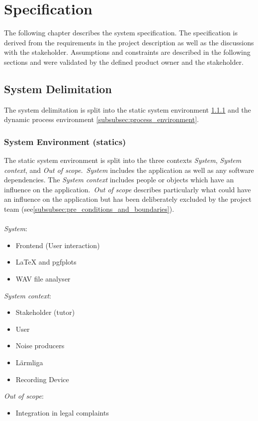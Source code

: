\section{Specification}\label{sec:specification}
The following chapter describes the system specification.
The specification is derived from the requirements in the project description
as well as the discussions with the stakeholder.
Assumptions and constraints are described in the following sections and were validated by
the defined product owner and the stakeholder.

\subsection{System Delimitation}\label{subsec:system-delimination}
The system delimitation is split into the static system environment \ref{subsubsec:system_environment}
and the dynamic process environment \ref{subsubsec:process_environment}.

\subsubsection{System Environment (statics)}\label{subsubsec:system_environment}
The static system environment is split into the three contexts \textit{System}, \textit{System context}, and \textit{Out of scope}.\ \textit{System} includes the application
as well as any software dependencies.
The \textit{System context} includes people or objects which have an influence on the application.\ \textit{Out of scope} describes particularly
what could have an influence on the application but has been deliberately excluded by the project team (see\ref{subsubsec:pre_conditions_and_boundaries}). \\~\\
\textit{System}:
\begin{itemize}
    \item Frontend (User interaction)
    \item LaTeX and pgfplots
    \item WAV file analyser
\end{itemize}
\textit{System context}:
\begin{itemize}
    \item Stakeholder (tutor)
    \item User
    \item Noise producers
    \item Lärmliga
    \item Recording Device
\end{itemize}
\textit{Out of scope}:
\begin{itemize}
    \item Integration in legal complaints
\end{itemize}

